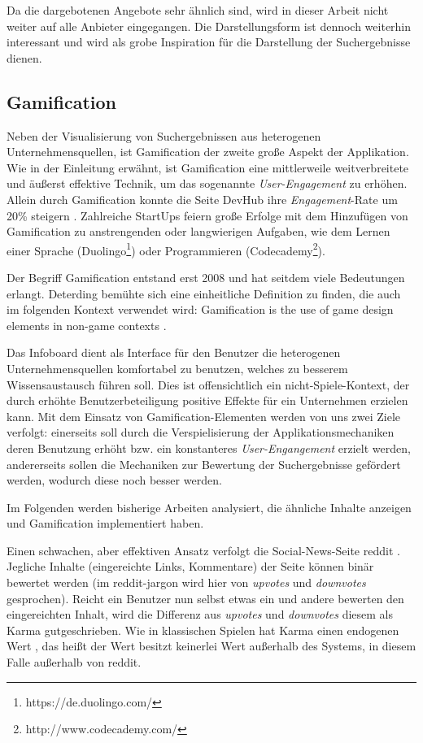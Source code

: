 \documentclass[12pt,twoside]{book}
\begin{document}
Da die dargebotenen Angebote sehr ähnlich sind, wird in dieser Arbeit nicht weiter auf alle Anbieter eingegangen. Die Darstellungsform ist dennoch weiterhin interessant und wird als grobe Inspiration für die Darstellung der Suchergebnisse dienen.


\subsection {Gamification}\label{sec:intro_game}

Neben der Visualisierung  von Suchergebnissen aus heterogenen Unternehmensquellen, ist Gamification der zweite große Aspekt der Applikation. Wie in der Einleitung erwähnt, ist Gamification eine mittlerweile weitverbreitete und äußerst effektive Technik, um das sogenannte \textit{User-Engagement} zu erhöhen. Allein durch Gamification konnte die Seite DevHub ihre \textit{Engagement}-Rate um 20\% steigern \citep[pp. 17]{zichermann2011gamification}. Zahlreiche StartUps feiern große Erfolge mit dem Hinzufügen von Gamification zu anstrengenden oder langwierigen Aufgaben, wie dem Lernen einer Sprache (Duolingo\footnote{https://de.duolingo.com/}) oder Programmieren (Codecademy\footnote{http://www.codecademy.com/}).

Der Begriff Gamification entstand erst 2008 und hat seitdem viele Bedeutungen erlangt. Deterding \cite{deterding2011game} bemühte sich eine einheitliche Definition zu finden, die auch im folgenden Kontext verwendet wird: \glqq Gamification is the use of game design elements in non-game contexts\grqq{} \citep{deterding2011game}.

Das Infoboard dient als Interface für den Benutzer die heterogenen Unternehmensquellen komfortabel zu benutzen, welches zu besserem Wissensaustausch führen soll. Dies ist offensichtlich ein nicht-Spiele-Kontext, der durch erhöhte Benutzerbeteiligung positive Effekte für ein Unternehmen erzielen kann.
Mit dem Einsatz von Gamification-Elementen werden von uns zwei Ziele verfolgt: einerseits soll durch die Verspielisierung der Applikationsmechaniken deren Benutzung erhöht bzw. ein konstanteres \textit{User-Engangement} erzielt werden, andererseits sollen die Mechaniken zur Bewertung der Suchergebnisse gefördert werden, wodurch diese noch besser werden.

Im Folgenden werden bisherige Arbeiten analysiert, die ähnliche Inhalte anzeigen und Gamification implementiert haben.

Einen schwachen, aber effektiven Ansatz verfolgt die Social-News-Seite reddit \cite{reddit}. Jegliche Inhalte (eingereichte Links, Kommentare) der Seite können binär bewertet werden (im reddit-jargon wird hier von \textit{upvotes} und \textit{downvotes} gesprochen). Reicht ein Benutzer nun selbst etwas ein und andere bewerten den eingereichten Inhalt, wird die Differenz aus \textit{upvotes} und \textit{downvotes} diesem als Karma gutgeschrieben. Wie in klassischen Spielen hat Karma einen endogenen Wert \citep[pp. 21 - 22]{costikyan2005have}, das heißt der Wert besitzt keinerlei Wert außerhalb des Systems, in diesem Falle außerhalb von reddit.
\end{document}
